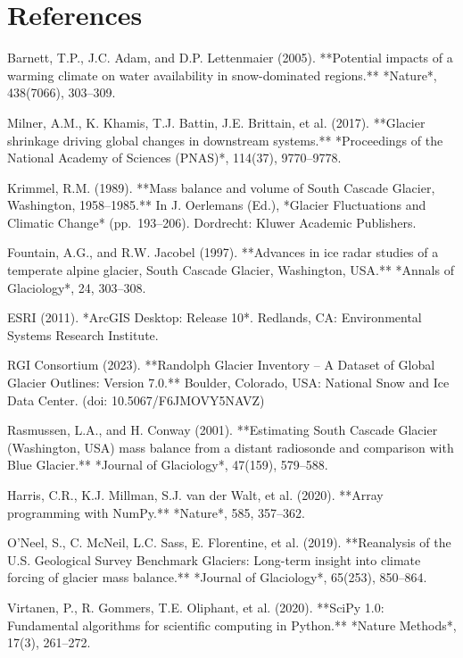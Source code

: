 \documentclass{article}
\begin{document}
\section{References}
\begin{thebibliography}{99}

     Barnett, T.P., J.C. Adam, and D.P. Lettenmaier (2005). **Potential impacts of a warming climate on water availability in snow-dominated regions.** *Nature*, 438(7066), 303–309.
    
     Milner, A.M., K. Khamis, T.J. Battin, J.E. Brittain, et al. (2017). **Glacier shrinkage driving global changes in downstream systems.** *Proceedings of the National Academy of Sciences (PNAS)*, 114(37), 9770–9778.
    
     Krimmel, R.M. (1989). **Mass balance and volume of South Cascade Glacier, Washington, 1958–1985.** In J. Oerlemans (Ed.), *Glacier Fluctuations and Climatic Change* (pp. 193–206). Dordrecht: Kluwer Academic Publishers.
    
     Fountain, A.G., and R.W. Jacobel (1997). **Advances in ice radar studies of a temperate alpine glacier, South Cascade Glacier, Washington, USA.** *Annals of Glaciology*, 24, 303–308.
    
     ESRI (2011). *ArcGIS Desktop: Release 10*. Redlands, CA: Environmental Systems Research Institute.
    
     RGI Consortium (2023). **Randolph Glacier Inventory – A Dataset of Global Glacier Outlines: Version 7.0.** Boulder, Colorado, USA: National Snow and Ice Data Center. (doi: 10.5067/F6JMOVY5NAVZ)
    
     Rasmussen, L.A., and H. Conway (2001). **Estimating South Cascade Glacier (Washington, USA) mass balance from a distant radiosonde and comparison with Blue Glacier.** *Journal of Glaciology*, 47(159), 579–588.
    
     Harris, C.R., K.J. Millman, S.J. van der Walt, et al. (2020). **Array programming with NumPy.** *Nature*, 585, 357–362.
    
     O’Neel, S., C. McNeil, L.C. Sass, E. Florentine, et al. (2019). **Reanalysis of the U.S. Geological Survey Benchmark Glaciers: Long-term insight into climate forcing of glacier mass balance.** *Journal of Glaciology*, 65(253), 850–864.
    
     Virtanen, P., R. Gommers, T.E. Oliphant, et al. (2020). **SciPy 1.0: Fundamental algorithms for scientific computing in Python.** *Nature Methods*, 17(3), 261–272.
    

\end{thebibliography}
\end{document}

